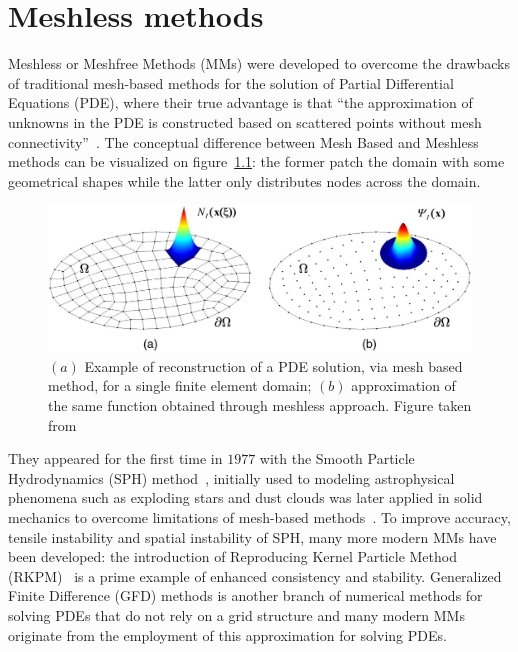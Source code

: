 \chapter{Meshless methods} \label{chap:meshless_methods}

Meshless or Meshfree Methods (MMs) were developed to overcome the drawbacks of traditional mesh-based methods for the solution of Partial Differential Equations (PDE), where their true advantage is that ``the approximation of unknowns in the PDE is constructed based on scattered points without mesh connectivity''~\cite{Chen:meshless_overview_after_20_years}. The conceptual difference between Mesh Based and Meshless methods can be visualized on figure~\ref{fig:mesh_vs_meshless}: the former patch the domain with some geometrical shapes while the latter only distributes nodes across the domain.

\begin{figure}
	\centering
	\includegraphics[width=\textwidth]{img/mesh_vs_meshless.png}
	\caption{$(a)$ Example of reconstruction of a PDE solution, via mesh based method, for a single finite element domain; $(b)$ approximation of the same function obtained through meshless approach. Figure taken from~\cite{Chen:meshless_overview_after_20_years}}
	\label{fig:mesh_vs_meshless}
\end{figure}

They appeared for the first time in $1977$ with the Smooth Particle Hydrodynamics (SPH) method~\cite{Belytschko:meshless_overview}, initially used to modeling astrophysical phenomena such as exploding stars and dust clouds was later applied in solid mechanics to overcome limitations of mesh-based methods~\cite{Benz:SPH_on_solid_mechanics}. To improve accuracy, tensile instability and spatial instability of SPH, many more modern MMs have been developed: the introduction of Reproducing Kernel Particle Method (RKPM)~\cite{Liu:RKPM} is a prime example of enhanced consistency and stability.
Generalized Finite Difference (GFD) methods is another branch of numerical methods for solving PDEs that do not rely on a grid structure and many modern MMs originate from the employment of this approximation for solving PDEs.

